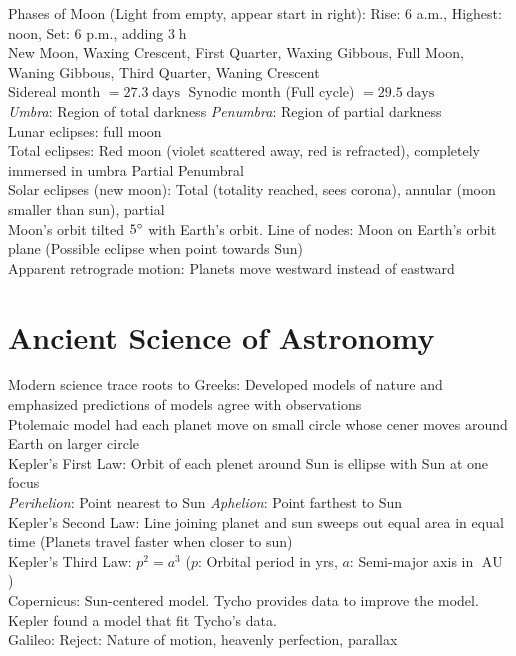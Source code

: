 \documentclass{article}
\DeclareMathOperator{\h}{h}
\DeclareMathOperator{\days}{days}
\DeclareMathOperator{\AU}{AU}
\begin{document}
Phases of Moon (Light from empty, appear start in right): Rise: $6$ a.m., Highest: noon, Set: $6$ p.m., adding $3\h$\\
New Moon, Waxing Crescent, First Quarter, Waxing Gibbous, Full Moon, Waning Gibbous, Third Quarter, Waning Crescent\\
Sidereal month $=27.3\days$ \qquad Synodic month (Full cycle) $=29.5\days$\\
\textit{Umbra}: Region of total darkness \quad \textit{Penumbra}: Region of partial darkness\\
Lunar eclipses: full moon\\
Total eclipses: Red moon (violet scattered away, red is refracted), completely immersed in umbra \quad Partial \quad Penumbral\\
Solar eclipses (new moon): Total (totality reached, sees corona), annular (moon smaller than sun), partial\\
Moon's orbit tilted $5\degree$ with Earth's orbit. \quad Line of nodes: Moon on Earth's orbit plane (Possible eclipse when point towards Sun)\\
Apparent retrograde motion: Planets move westward instead of eastward
\section{Ancient Science of Astronomy}
Modern science trace roots to Greeks: Developed models of nature and emphasized predictions of models agree with observations\\
Ptolemaic model had each planet move on small circle whose cener moves around Earth on larger circle\\
Kepler's First Law: Orbit of each plenet around Sun is ellipse with Sun at one focus\\
\textit{Perihelion}: Point nearest to Sun \quad \textit{Aphelion}: Point farthest to Sun\\
Kepler's Second Law: Line joining planet and sun sweeps out equal area in equal time (Planets travel faster when closer to sun)\\
Kepler's Third Law: $p^{2}=a^{3}$ ($p$: Orbital period in yrs, $a$: Semi-major axis in $\AU$)\\
Copernicus: Sun-centered model. Tycho provides data to improve the model. Kepler found a model that fit Tycho's data.\\
Galileo: Reject: Nature of motion, heavenly perfection, parallax
\newpage
\end{document}
